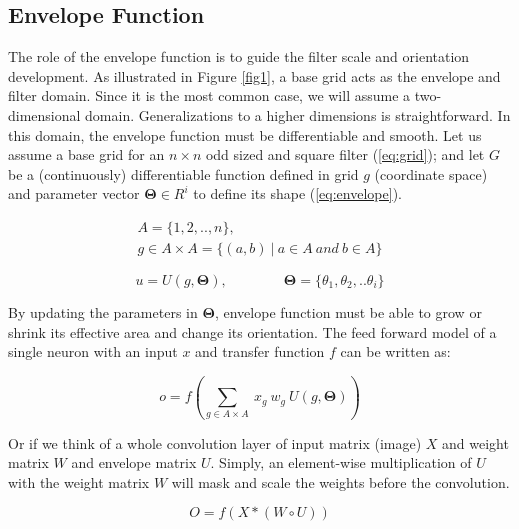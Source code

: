 \documentclass{bmvc2k}
\begin{document}
\subsection{Envelope Function}
\label{sec:methods:envelope}
The role of the envelope function is to guide the filter scale and orientation development. As illustrated in Figure \ref{fig1}, a base grid acts as the envelope and filter domain. Since it is the most common case, we will assume a two-dimensional domain. Generalizations to a higher dimensions is straightforward. In this domain, the envelope function must be differentiable and smooth. Let us assume a base grid for an $n \times n$ odd sized and square filter (\ref{eq:grid}); and let $G$ be a (continuously) differentiable function defined in grid $g$ (coordinate space) and parameter vector $\boldsymbol{\Theta} \in R^i$ to define its shape (\ref{eq:envelope}).

\begin{equation}
\label{eq:grid}
\begin{gathered}
A = \{1, 2, .. , n\},
\\
g \in  A \times A = \{(a, b) \: | \: a \in A \: and \: b \in A\}
\end{gathered}
\end{equation}

\begin{equation}
\label{eq:envelope}
u = U(g, \boldsymbol{\Theta}), \qquad \qquad  \boldsymbol{\Theta} = \{\theta_1, \theta_2, .. \theta_i\}
\end{equation}

By updating the parameters in $\boldsymbol{\Theta}$, envelope function must be able to grow or shrink its effective area and change its orientation. The feed forward model of a single neuron with an input $x$ and transfer function $f$ can be written as: 

\begin{equation}
o = f(\sum\limits_{g \in A \times A} \: x_{g} \: w_{g} \: U({g,\boldsymbol{\Theta}}))
\end{equation}

Or if we think of a whole convolution layer of input matrix (image) $X$ and weight matrix $W$ and envelope matrix $U$. Simply, an element-wise multiplication of $U$ with the weight matrix $W$ will mask and scale the weights before the convolution.

\begin{equation}
O = f(X* (W \circ U))
\end{equation}
\end{document}
